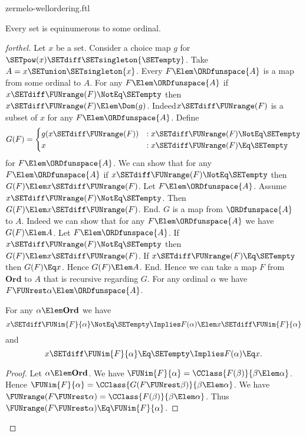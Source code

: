 \documentclass{stex}
\newcommand\Ord{\textbf{Ord}}
\begin{document}
\begin{smodule}{zermelo-wellordering.ftl}
\begin{theorem}[forthel,title=Zermelo's Well-Ordering Theorem,name=Zermelo]
  Every set is equinumerous to some ordinal.
\end{theorem}
\begin{proof}[forthel]
  Let $x$ be a set.
  Consider a choice map $g$ for $\SETpow(x) \SETdiff \SETsingleton{\SETempty}$.
  Take $A = x \SETunion \SETsingleton{x}$.
  Every $F \Elem \ORDfunspace{A}$ is a map from some ordinal to $A$.
  For any $F \Elem \ORDfunspace{A}$ if $x \SETdiff \FUNrange(F) \NotEq \SETempty$ then $x \SETdiff \FUNrange(F) \Elem \Dom(g)$.
  Indeed\linebreak $x \SETdiff \FUNrange(F)$ is a subset of $x$ for any $F \Elem \ORDfunspace{A}$.
  Define \[ G(F) =
    \begin{cases}
      g(x \SETdiff \FUNrange(F))
      & : x \SETdiff \FUNrange(F) \NotEq \SETempty
      \\
      x
      & : x \SETdiff \FUNrange(F) \Eq \SETempty
    \end{cases} \]
  for $F \Elem \ORDfunspace{A}$.
  We can show that for any $F \Elem \ORDfunspace{A}$ if $x \SETdiff \FUNrange(F) \NotEq \SETempty$ then $G(F) \Elem x \SETdiff \FUNrange(F)$.
    Let $F \Elem \ORDfunspace{A}$.
    Assume $x \SETdiff \FUNrange(F) \NotEq \SETempty$.  
    Then $G(F) \Elem x \SETdiff \FUNrange(F)$.
  End.
  $G$ is a map from $\ORDfunspace{A}$ to $A$.
  Indeed we can show that for any $F \Elem \ORDfunspace{A}$ we have $G(F) \Elem A$.
    Let $F \Elem \ORDfunspace{A}$.
    If $x \SETdiff \FUNrange(F) \NotEq \SETempty$ then\linebreak $G(F) \Elem x \SETdiff \FUNrange(F)$.
    If $x \SETdiff \FUNrange(F) \Eq \SETempty$ then $G(F) \Eq x$.
    Hence $G(F) \Elem A$.
  End.
  Hence we can take a map $F$ from $\Ord$ to $A$ that is recursive regarding $G$.
  For any ordinal $\alpha$ we have $F \FUNrest \alpha \Elem \ORDfunspace{A}$.

  For any $\alpha \Elem \Ord$ we have
  \[ x \SETdiff \FUNim{F}{\alpha} \NotEq \SETempty \Implies F(\alpha) \Elem x \SETdiff \FUNim{F}{\alpha} \]
  and
  \[ x \SETdiff \FUNim{F}{\alpha} \Eq \SETempty \Implies F(\alpha) \Eq x. \]
  \begin{proof}
    Let $\alpha \Elem \Ord$.
    We have $\FUNim{F}{\alpha} = \CClass{F(\beta)}{\beta \Elem \alpha}$.
    Hence $\FUNim{F}{\alpha} = \CClass{G(F \FUNrest \beta)}{\beta \Elem \alpha}$.
    We have $\FUNrange(F \FUNrest \alpha) = \CClass{F(\beta)}{\beta \Elem \alpha}$.
    Thus\linebreak $\FUNrange(F \FUNrest \alpha) \Eq \FUNim{F}{\alpha}$.


\end{proof}
\end{proof}
\end{smodule}
\end{document}
